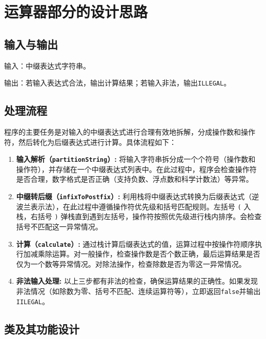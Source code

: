 \documentclass[UTF8]{ctexart}
\begin{document}
\section{运算器部分的设计思路}

\subsection{输入与输出}

输入：中缀表达式字符串。

输出：若输入表达式合法，输出计算结果；若输入非法，输出\texttt{ILLEGAL}。

\subsection{处理流程}

程序的主要任务是对输入的中缀表达式进行合理有效地拆解，分成操作数和操作符，然后转化为后缀表达式进行计算。具体流程如下：

\begin{enumerate}
    \item \textbf{输入解析（\texttt{partitionString}）:} 将输入字符串拆分成一个个符号（操作数和操作符），并存储在一个中缀表达式列表中。在此过程中，程序会检查操作符是否合理，数字格式是否正确（支持负数、浮点数和科学计数法）等异常。
    
    \item \textbf{中缀转后缀（\texttt{infixToPostfix}）:} 利用栈将中缀表达式转换为后缀表达式（逆波兰表示法），在此过程中遵循操作符优先级和括号匹配规则。左括号 \texttt{(} 入栈，右括号 \texttt{)} 弹栈直到遇到左括号，操作符按照优先级进行栈内排序。会检查括号不匹配这一异常情况。
    
    \item \textbf{计算（\texttt{calculate}）:} 通过栈计算后缀表达式的值，运算过程中按操作符顺序执行加减乘除运算。对一般操作，检查操作数是否个数正确，最后运算结果是否仅为一个数等异常情况。对除法操作，检查除数是否为零这一异常情况。
    
    \item \textbf{非法输入处理:} 以上三步都有非法的检查，确保运算结果的正确性。如果发现非法情况（如除数为零、括号不匹配、连续运算符等），立即返回\texttt{false}并输出\texttt{IILEGAL}。
\end{enumerate}

\subsection{类及其功能设计}
\end{document}

